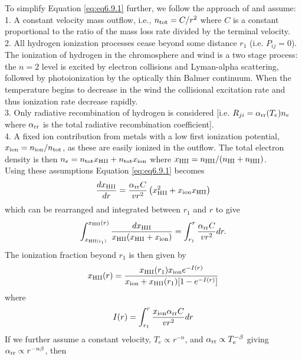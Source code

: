 To simplify Equation \ref{eq:eq6.9.1} further, we follow the approach of \cite{glassgold_1986} and assume:\\
1. A constant velocity mass outflow, i.e., $n_{\rm{tot}}=C/r^2$ where $C$ is a constant proportional to the ratio of the mass loss rate divided by the terminal velocity.\\
2. All hydrogen ionization processes cease beyond some distance $r_{1}$ (i.e. $P_{ij}=0$). The ionization of hydrogen in the chromosphere and wind is a two stage process: the $n = 2$ level is excited by electron collisions and Lyman-alpha scattering, followed by photoionization by the optically thin Balmer continuum. When the temperature begins to decrease in the wind the collisional excitation rate and thus ionization rate decrease rapidly.\\
3. Only radiative recombination of hydrogen is considered [i.e. $R_{ji}=\alpha _{\rm{rr}}(T_e)n_e$ where $\alpha _{\rm{rr}}$ is the total radiative recombination coefficient].\\
4. A fixed ion contribution from metals with a low first ionization potential, $x_{\rm{ion}}=n_{\rm{ion}}/n_{\rm{tot}}$, as these are easily ionized in the outflow. The total electron density is then $n_e=n_{\rm{tot}}x_{\rm{HII}} + n_{\rm{tot}}x_{\rm{ion}}$ where  $x_{\rm{HII}}=n_{\rm{HII}}/(n_{\rm{HI}}+n_{\rm{HII}})$.\\
Using these assumptions Equation \ref{eq:eq6.9.1} becomes
\begin{equation}
\frac{dx_{\rm{HII}}}{dr}=\frac{\alpha _{\rm{rr}}C}{vr^2}\left(x_{\rm{HII}}^2 +x_{\rm{ion}}x_{\rm{HII}} \right)
\end{equation}
which can be rearranged and integrated between $r_1$ and $r$ to give
\begin{equation}
\int_{x_{\rm{HII}(r_1)}}^{x_{\rm{HII}}(r)}\frac{dx_{\rm{HII}}}{x_{\rm{HII}}(x_{\rm{HII}}+x_{\rm{ion}})}=\int_{r_{1}}^r \frac{\alpha _{\rm{rr}} C }{vr^2}dr.
\end{equation}
The ionization fraction beyond $r_{1}$ is then given by
\begin{equation}
x_{\rm{HII}}(r)= \frac{x_{\rm{HII}}(r_1)x_{\rm{ion}}e^{-I(r)}}{x_{\rm{ion}}+x_{\rm{HII}}(r_1)[1 - e^{-I(r)}]}
\label{eq:eq4}
\end{equation}
where
\begin{equation}
I(r)=\int_{r_{1}}^r \frac{x_{\rm{ion}} \alpha _{\rm{rr}}C }{vr^2}dr
\end{equation}
If we further assume a constant velocity, $T_{e} \propto r^{-n}$, and $\alpha _{\rm{rr}} \propto T_e ^{-\beta}$ giving $\alpha _{\rm{rr}} \propto r^{-n\beta}$, then
